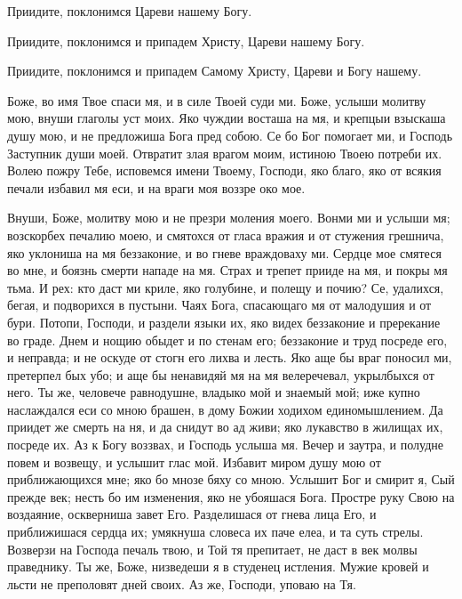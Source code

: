 \begin{mymulticols}



 Приидите, поклонимся Цареви нашему Богу.



Приидите, поклонимся и припадем Христу, Цареви нашему Богу.



Приидите, поклонимся и припадем Самому Христу, Цареви и Богу нашему.



Боже, во имя Твое спаси мя, и в силе Твоей суди ми. Боже, услыши молитву мою, внуши глаголы уст моих. Яко чуждии восташа на мя, и крепцыи взыскаша душу мою, и не предложиша Бога пред собою. Се бо Бог помогает ми, и Господь Заступник души моей. Отвратит злая врагом моим, истиною Твоею потреби их. Волею пожру Тебе, исповемся имени Твоему, Господи, яко благо, яко от всякия печали избавил мя еси, и на враги моя воззре око мое.




Внуши, Боже, молитву мою и не презри моления моего. Вонми ми и услыши мя; возскорбех печалию моею, и смятохся от гласа вражия и от стужения грешнича, яко уклониша на мя беззаконие, и во гневе враждоваху ми. Сердце мое смятеся во мне, и боязнь смерти нападе на мя. Страх и трепет прииде на мя, и покры мя тьма. И рех: кто даст ми криле, яко голубине, и полещу и почию? Се, удалихся, бегая, и подворихся в пустыни. Чаях Бога, спасающаго мя от малодушия и от бури. Потопи, Господи, и раздели языки их, яко видех беззаконие и пререкание во граде. Днем и нощию обыдет и по стенам его; беззаконие и труд посреде его, и неправда; и не оскуде от стогн его лихва и лесть. Яко аще бы враг поносил ми, претерпел бых убо; и аще бы ненавидяй мя на мя велеречевал, укрылбыхся от него. Ты же, человече равнодушне, владыко мой и знаемый мой; иже купно наслаждался еси со мною брашен, в дому Божии ходихом единомышлением. Да приидет же смерть на ня, и да снидут во ад живи; яко лукавство в жилищах их, посреде их. Аз к Богу воззвах, и Господь услыша мя. Вечер и заутра, и полудне повем и возвещу, и услышит глас мой. Избавит миром душу мою от приближающихся мне; яко бо мнозе бяху со мною. Услышит Бог и смирит я, Сый прежде век; несть бо им изменения, яко не убояшася Бога. Простре руку Свою на воздаяние, оскверниша завет Его. Разделишася от гнева лица Его, и приближишася сердца их; умякнуша словеса их паче елеа, и та суть стрелы. Возверзи на Господа печаль твою, и Той тя препитает, не даст в век молвы праведнику. Ты же, Боже, низведеши я в студенец истления. Мужие кровей и льсти не преполовят дней своих. Аз же, Господи, уповаю на Тя.



\end{mymulticols}
